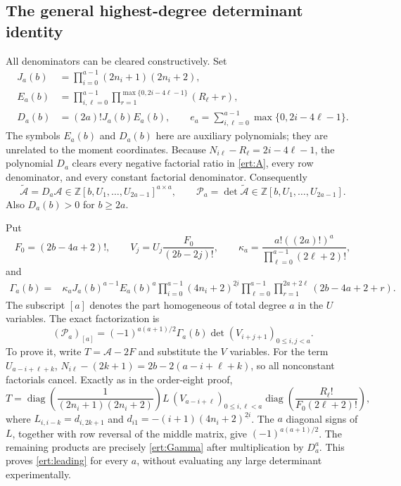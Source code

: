 \subsection{The general highest-degree determinant identity}

All denominators can be cleared constructively. Set
\begin{align*}
 J_a(b)&=\prod_{i=0}^{a-1}(2n_i+1)(2n_i+2),\\
 E_a(b)&=\prod_{i,\ell=0}^{a-1}
           \prod_{r=1}^{\max\{0,2i-4\ell-1\}}(R_\ell+r),\\
 D_a(b)&=(2a)!J_a(b)E_a(b),\qquad
 e_a=\sum_{i,\ell=0}^{a-1}\max\{0,2i-4\ell-1\}.
\end{align*}
The symbols $E_a(b)$ and $D_a(b)$ here are auxiliary polynomials;
they are unrelated to the moment coordinates.
Because $N_{i\ell}-R_\ell=2i-4\ell-1$, the polynomial $D_a$
clears every negative factorial ratio in \eqref{ert:A}, every
row denominator, and every constant factorial denominator.
Consequently
\[
 \widetilde{\mathcal A}=D_a\mathcal A
       \in\mathbb Z[b,U_1,\ldots,U_{2a-1}]^{a\times a},
 \qquad \mathscr P_a=\det\widetilde{\mathcal A}
       \in\mathbb Z[b,U_1,\ldots,U_{2a-1}].
\]
Also $D_a(b)>0$ for $b\ge2a$.

Put
\[
 F_0=(2b-4a+2)!,\qquad
 V_j=U_j\frac{F_0}{(2b-2j)!},\qquad
 \kappa_a=\frac{a!((2a)!)^a}{\prod_{\ell=0}^{a-1}(2\ell+2)!},
\]
and
\begin{align}
 \Gamma_a(b)={}&\kappa_aJ_a(b)^{a-1}E_a(b)^a
 \prod_{i=0}^{a-1}(4n_i+2)^{\underline{2i}}
 \prod_{\ell=0}^{a-1}\prod_{r=1}^{2a+2\ell}(2b-4a+2+r).
 \label{ert:Gamma}
\end{align}
The subscript $[a]$ denotes the part homogeneous of total degree
$a$ in the $U$ variables. The exact factorization is
\begin{equation}\label{ert:leading}
 (\mathscr P_a)_{[a]}
 =(-1)^{a(a+1)/2}\Gamma_a(b)
           \det(V_{i+j+1})_{0\le i,j<a}.
\end{equation}
To prove it, write $T=\mathcal A-2F$ and substitute the $V$ variables.
For the term $U_{a-i+\ell+k}$,
$N_{i\ell}-(2k+1)=2b-2(a-i+\ell+k)$, so all nonconstant
factorials cancel. Exactly as in the order-eight proof,
\[
 T=\operatorname{diag}\!\left(\frac1{(2n_i+1)(2n_i+2)}\right)
    L\,(V_{a-i+\ell})_{0\le i,\ell<a}
    \operatorname{diag}\!\left(\frac{R_\ell!}{F_0(2\ell+2)!}\right),
\]
where $L_{i,i-k}=d_{i,2k+1}$ and
$d_{i1}=-(i+1)(4n_i+2)^{\underline{2i}}$.
The $a$ diagonal signs of $L$, together with row reversal of the
middle matrix, give $(-1)^{a(a+1)/2}$. The remaining products are
precisely \eqref{ert:Gamma} after multiplication by $D_a^a$.
This proves \eqref{ert:leading} for every $a$, without evaluating
any large determinant experimentally.

